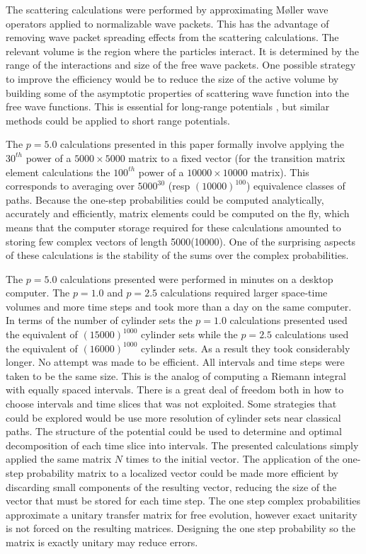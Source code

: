 \documentclass[aps,prc,reprint,noshowpacs,groupedaddress,onecolumn]{revtex4}
\begin{document}
The scattering calculations were performed by approximating M{\o}ller
wave operators \cite{Moller} applied to normalizable wave packets.
This has the advantage of removing wave packet spreading effects from
the scattering calculations.  The relevant volume is the region where
the particles interact.  It is determined by the range of the
interactions and size of the free wave packets.  One possible strategy
to improve the efficiency would be to reduce the size of the active
volume by building some of the asymptotic properties of scattering
wave function into the free wave functions. This is essential for
long-range potentials \cite{Dollard} \cite{Mulherin}\cite{Busalev},
but similar methods could be applied to short range potentials.
 
The $p=5.0$ calculations presented in this paper formally involve
applying the $30^{th}$ power of a $5000 \times 5000$ matrix to a fixed
vector (for the transition matrix element calculations the $100^{th}$
power of a $10000 \times 10000$ matrix). This corresponds to averaging
over $5000^{30}$ (resp $(10000)^{100}$) equivalence classes of paths.
Because the one-step probabilities could be computed analytically,
accurately and efficiently, matrix elements could be computed on the
fly, which means that the computer storage required for these
calculations amounted to storing few complex vectors of length
5000(10000).  One of the surprising aspects of these calculations is
the stability of the sums over the complex probabilities.

The $p=5.0$ calculations presented were performed in minutes on a
desktop computer.  The $p=1.0$ and $p=2.5$ calculations required
larger space-time volumes and more time steps and took more than a day
on the same computer.
In terms of the number of
cylinder sets the $p=1.0$ calculations presented used the equivalent of
$(15000)^{1000}$ cylinder sets while the $p=2.5$ calculations used the
equivalent of $(16000)^{1000}$ cylinder sets.  As a result they took
considerably longer.  No attempt was made to be efficient.  All
intervals and time steps were taken to be the same size.  This is the
analog of computing a Riemann integral with equally spaced intervals.
There is a great deal of freedom both in how to choose intervals and
time slices that was not exploited.  Some  strategies that could be
explored would be use more resolution of cylinder sets near classical
paths.  The structure of the potential could be used to determine 
and optimal decomposition of each time slice into intervals.
The presented calculations simply applied the same matrix $N$ times to
the initial vector.  The application of the one-step probability
matrix to a localized vector could be made more efficient by
discarding small components of the resulting vector, reducing the size
of the vector that must be stored for each time step.  The one step
complex probabilities approximate a unitary transfer matrix for free
evolution, however exact unitarity is not forced on the resulting matrices.
Designing the one step probability so the matrix is exactly unitary
may reduce errors.
\end{document}
